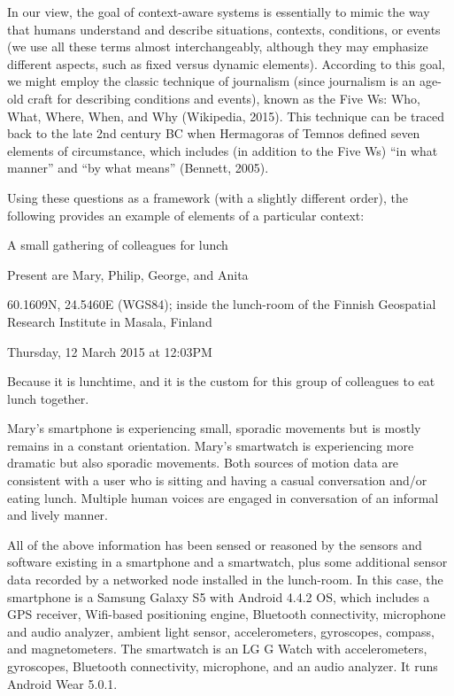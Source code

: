 In our view, the goal of context-aware systems is essentially to mimic the way that humans understand and describe situations, contexts, conditions, or events (we use all these terms almost interchangeably, although they may emphasize different aspects, such as fixed versus dynamic elements). According to this goal, we might employ the classic technique of journalism (since journalism is an age-old craft for describing conditions and events), known as the Five Ws: Who, What, Where, When, and Why (Wikipedia, 2015). This technique can be traced back to the late 2nd century BC when Hermagoras of Temnos defined seven elements of circumstance, which includes (in addition to the Five Ws) ``in what manner'' and ``by what means'' (Bennett, 2005).

Using these questions as a framework (with a slightly different order), the following provides an example of elements of a particular context:
%
\begin{bold_description}
\item[What:]A small gathering of colleagues for lunch
\item[Who:] Present are Mary, Philip, George, and Anita
\item[Where:]60.1609\textdegree{}N, 24.5460\textdegree{}E (WGS84); inside the lunch-room of the Finnish Geospatial Research Institute in Masala, Finland
\item[When:]Thursday, 12 March 2015 at 12:03PM
\item[Why:]Because it is lunchtime, and it is the custom for this group of colleagues to eat lunch together.
\item[In What Manner:] Mary's smartphone is experiencing small, sporadic movements but is mostly remains in a constant orientation. Mary's smartwatch is experiencing more dramatic but also sporadic movements. Both sources of motion data are consistent with a user who is sitting and having a casual conversation and/or eating lunch. Multiple human voices are engaged in conversation of an informal and lively manner.
\item[By What Means:]All of the above information has been sensed or reasoned by the sensors and software existing in a smartphone and a smartwatch, plus some additional sensor data recorded by a networked node installed in the lunch-room. In this case, the smartphone is a Samsung Galaxy S5 with Android 4.4.2 OS, which includes a GPS receiver, Wifi-based positioning engine, Bluetooth connectivity, microphone and audio analyzer, ambient light sensor, accelerometers, gyroscopes, compass, and magnetometers. The smartwatch is an LG G Watch with accelerometers, gyroscopes, Bluetooth connectivity, microphone, and an audio analyzer. It runs Android Wear 5.0.1.
\end{bold_description}

